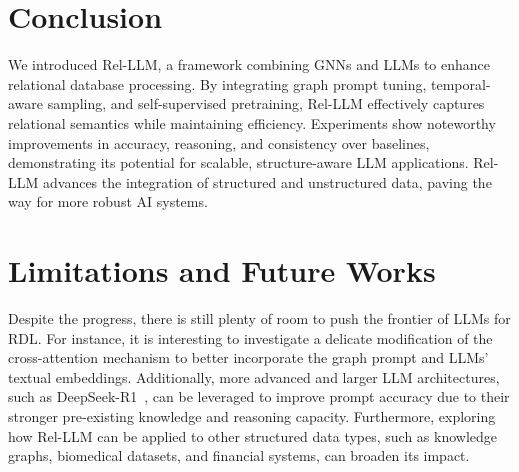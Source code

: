 \documentclass[11pt]{article}
\begin{document}

\section{Conclusion} 
We introduced Rel-LLM, a framework combining GNNs and LLMs to enhance relational database processing. By integrating graph prompt tuning, temporal-aware sampling, and self-supervised pretraining, Rel-LLM effectively captures relational semantics while maintaining efficiency. Experiments show noteworthy improvements in accuracy, reasoning, and consistency over baselines, demonstrating its potential for scalable, structure-aware LLM applications. Rel-LLM advances the integration of structured and unstructured data, paving the way for more robust AI systems.  


\section{Limitations and Future Works}
\label{app:limitations}
Despite the progress, there is still plenty of room to push the frontier of LLMs for RDL. For instance, it is interesting to investigate a delicate modification of the cross-attention mechanism to better incorporate the graph prompt and LLMs' textual embeddings. 
Additionally, more advanced and larger LLM architectures, such as DeepSeek-R1~\citep{guo2025deepseek}, can be leveraged to improve prompt accuracy due to their stronger pre-existing knowledge and reasoning capacity. Furthermore, exploring how Rel-LLM can be applied to other structured data types, such as knowledge graphs, biomedical datasets, and financial systems, can broaden its impact. 
%

\end{document}
